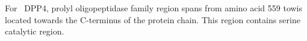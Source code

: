 For~ DPP4, prolyl oligopeptidase family region spans from amino acid 559 towis located towards the C-terminus of the protein chain. This region contains serine catalytic region.  